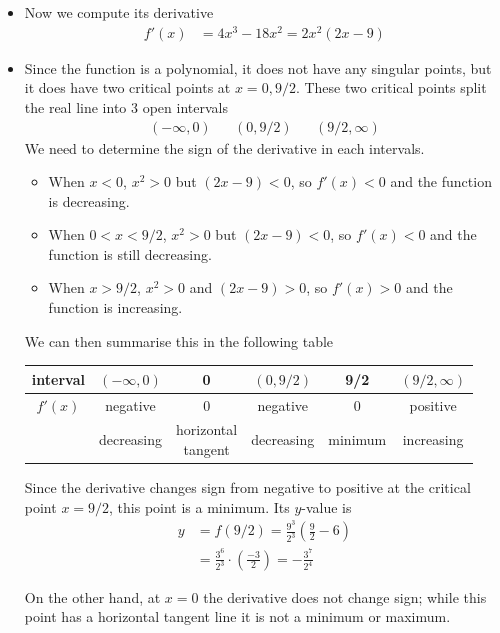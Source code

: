 \begin{eg}
\begin{itemize}
\item Now we compute its derivative
\begin{align*}
  f'(x) &= 4x^3-18x^2 = 2x^2(2x-9)
\end{align*}
\item Since the function is a polynomial, it does not have any singular points, but it
does have two critical points at $x=0, 9/2$. These two critical points split the real
line into 3 open intervals
\begin{align*}
  (-\infty, 0) && (0,9/2) && (9/2,\infty)
\end{align*}
We need to determine the sign of the derivative in each intervals.
\begin{itemize}
\item When $x<0$, $x^2>0$ but $(2x-9)<0$, so $f'(x)<0$ and the function is decreasing.
\item When $0<x<9/2$, $x^2>0$ but $(2x-9)<0$, so $f'(x)<0$ and the function is
still decreasing.
\item When $x>9/2$, $x^2>0$ and $(2x-9)>0$, so $f'(x)>0$ and the function is increasing.
\end{itemize}
We can then summarise this in the following table
\begin{center}
\begin{tabular}{|c|c||c||c||c||c|}
\hline
interval & $(-\infty,0)$ & 0 & $(0,9/2)$ &
9/2 & $(9/2,\infty)$\\
\hline
$f'(x)$ & negative & 0 &
negative & 0 & positive \\
\hline
& decreasing & \parbox[c]{21mm}{\centering horizontal\\ tangent }
& decreasing & minimum & increasing
\\
\hline
\end{tabular}
\end{center}
Since the derivative changes sign from negative to positive at the critical point
$x=9/2$, this point is a minimum. Its $y$-value is
\begin{align*}
  y&=f(9/2) = \frac{9^3}{2^3}\left(\frac{9}{2} - 6\right)\\
  &= \frac{3^6}{2^3} \cdot \left(\frac{-3}{2} \right) = -\frac{3^7}{2^4}
\end{align*}


On the other hand, at $x=0$ the derivative
does not change sign; while this point has a horizontal tangent line it is not a minimum
or maximum.


\end{itemize}
\end{eg}
